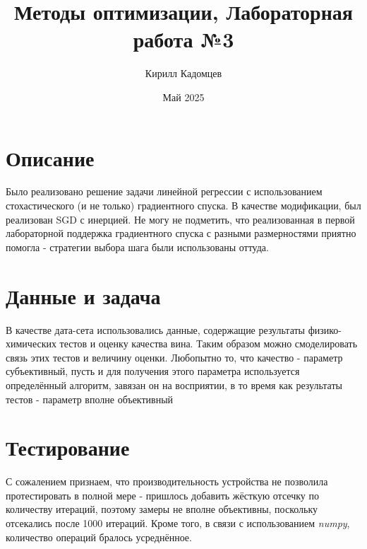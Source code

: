 \documentclass{article}
\title{Методы оптимизации, Лабораторная работа №3}
\author{Кирилл Кадомцев}
\date{Май 2025}
\begin{document}
\maketitle
\tableofcontents

\section{Описание}
Было реализовано решение задачи линейной регрессии с использованием стохастического (и не только) градиентного спуска. В качестве модификации, был реализован SGD с инерцией. Не могу не подметить, что реализованная в первой лабораторной поддержка градиентного спуска с разными размерностями приятно помогла - стратегии выбора шага были использованы оттуда.


\section{Данные и задача}
В качестве дата-сета использовались данные, содержащие результаты физико-химических тестов и оценку качества вина. Таким образом можно смоделировать связь этих тестов и величину оценки. Любопытно то, что качество - параметр субъективный, пусть и для получения этого параметра используется определённый алгоритм, завязан он на восприятии, в то время как результаты тестов - параметр вполне объективный

\section{Тестирование}
С сожалением признаем, что производительность устройства не позволила протестировать в полной мере - пришлось добавить жёсткую отсечку по количеству итераций, поэтому замеры не вполне объективны, поскольку отсекались после 1000 итераций. Кроме того, в связи с использованием \textit{numpy}, количество операций бралось усреднённое.
\end{document}
